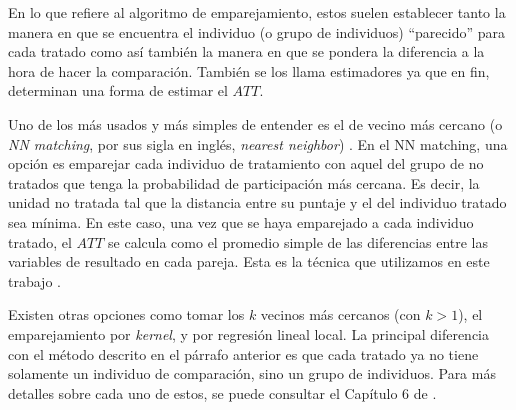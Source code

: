 \documentclass[../../main.tex]{subfiles}
\begin{document}
En lo que refiere al algoritmo de emparejamiento, estos suelen establecer tanto la manera
en que se encuentra el individuo (o grupo de individuos) ``parecido'' para cada tratado
como así también la manera en que se pondera la diferencia a la hora de hacer la
comparación. También se los llama estimadores ya que en fin, determinan una forma de
estimar el \(ATT\).

Uno de los más usados y más simples de entender es el de vecino más cercano (o \textit{NN
matching}, por sus sigla en inglés, \textit{nearest neighbor}) \cite{bernal}. En el NN
matching, una opción es emparejar cada individuo de tratamiento con aquel del grupo de no
tratados que tenga la probabilidad de participación más cercana. Es decir, la unidad no
tratada tal que la distancia entre su puntaje y el del individuo tratado sea mínima. En
este caso, una vez que se haya emparejado a cada individuo tratado, el \(ATT\) se calcula
como el promedio simple de las diferencias entre las variables de resultado en cada
pareja. Esta es la técnica que utilizamos en este trabajo \footnotemark.

Existen otras opciones como tomar los \(k\) vecinos más cercanos (con \(k > 1\)), el
emparejamiento por \textit{kernel}, y por regresión lineal local. La principal diferencia
con el método descrito en el párrafo anterior es que cada tratado ya no tiene solamente un
individuo de comparación, sino un grupo de individuos. Para más detalles sobre cada uno de
estos, se puede consultar el Capítulo 6 de \cite{bernal}.

\end{document}
